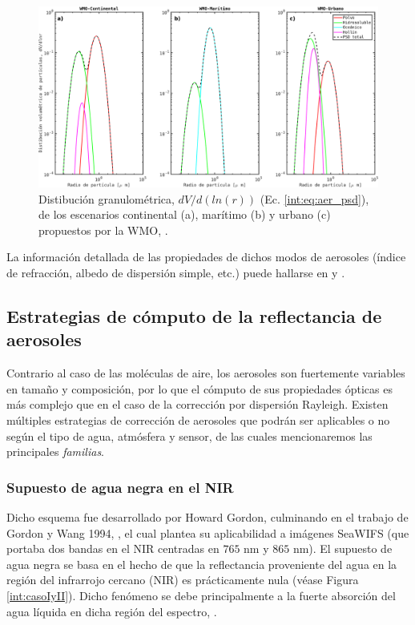         \begin{figure}
        \centering
        \includegraphics[width=\textwidth]{int/figures/WMO_PSD.png}
        \caption[Distibuciones granulométricas de los escenarios de la WMO.]{Distibución granulométrica, $dV/d(ln(r))$ (Ec. \ref{int:eq:aer_psd}), de los escenarios continental (a), marítimo (b) y urbano (c) propuestos por la WMO, \cite{wmo1986}.}
        \label{int:WMO_PSD}
        \end{figure}
        
        La información detallada de las propiedades de dichos modos de aerosoles (índice de refracción, albedo de dispersión simple, etc.) puede hallarse en \cite{wmo1986} y \cite{lafrance2002}.
    
    \subsection{Estrategias de cómputo de la reflectancia de aerosoles}
	\label{int:s:aer_estrategias}
    
        Contrario al caso de las moléculas de aire, los aerosoles son fuertemente variables en tamaño y composición, por lo que el cómputo de sus propiedades ópticas es más complejo que en el caso de la corrección por dispersión Rayleigh. Existen múltiples estrategias de corrección de aerosoles que podrán ser aplicables o no según el tipo de agua, atmósfera y sensor, de las cuales mencionaremos las principales \textit{familias}.
    
    	\subsubsection{Supuesto de agua negra en el NIR}
    	\label{int:s:ACblackPixelNIR}
    
            Dicho esquema fue desarrollado por Howard Gordon, \cite{gordon1978}\cite{gordon1980}\cite{viollier1980}\cite{gordon1981}\cite{gordon1987}\cite{gordon1988} culminando en el trabajo de Gordon y Wang 1994, \cite{gordon1994}, el cual plantea su aplicabilidad a imágenes SeaWIFS (que portaba dos bandas en el NIR centradas en $765$ nm y $865$ nm). El supuesto de agua negra se basa en el hecho de que la reflectancia proveniente del agua en la región del infrarrojo cercano (NIR) es prácticamente nula (véase Figura \ref{int:casoIyII}). Dicho fenómeno se debe principalmente a la fuerte absorción del agua líquida en dicha región del espectro, \cite{pope1997}\cite{kou1993}.

